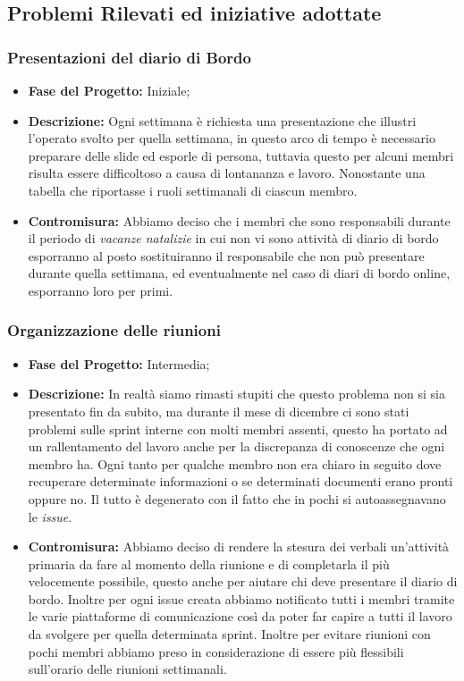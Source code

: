 \documentclass{article}
\begin{document}
\subsection{Problemi Rilevati ed iniziative adottate}
\subsubsection{Presentazioni del diario di Bordo}
\begin{itemize}
    \item \textbf{Fase del Progetto:} Iniziale;
    \item \textbf{Descrizione:} Ogni settimana è richiesta una presentazione che illustri l'operato svolto per quella settimana, in questo arco di tempo è necessario preparare delle slide ed esporle di persona, tuttavia questo per alcuni membri risulta essere difficoltoso a causa di lontananza e lavoro. Nonostante una tabella che riportasse i ruoli settimanali di ciascun membro.
    \item \textbf{Contromisura:} Abbiamo deciso che i membri che sono responsabili durante il periodo di \textit{vacanze natalizie} in cui non vi sono attività di diario di bordo esporranno al posto sostituiranno il responsabile che non può presentare durante quella settimana, ed eventualmente nel caso di diari di bordo online, esporranno loro per primi.
\end{itemize}
\subsubsection{Organizzazione delle riunioni}
\begin{itemize}
    \item \textbf{Fase del Progetto:} Intermedia;
    \item \textbf{Descrizione:} In realtà siamo rimasti stupiti che questo problema non si sia presentato fin da subito, ma durante il mese di dicembre ci sono stati problemi sulle sprint interne con molti membri assenti, questo ha portato ad un rallentamento del lavoro anche per la discrepanza di conoscenze che ogni membro ha. Ogni tanto per qualche membro non era chiaro in seguito dove recuperare determinate informazioni o se determinati documenti erano pronti oppure no. Il tutto è degenerato con il fatto che in pochi si autoassegnavano le \textit{issue}.
    \item \textbf{Contromisura:} Abbiamo deciso di rendere la stesura dei verbali un'attività primaria da fare al momento della riunione e di completarla il più velocemente possibile, questo anche per aiutare chi deve presentare il diario di bordo. Inoltre per ogni issue creata abbiamo notificato tutti i membri tramite le varie piattaforme di comunicazione così da poter far capire a tutti il lavoro da svolgere per quella determinata sprint. Inoltre per evitare riunioni con pochi membri abbiamo preso in considerazione di essere più flessibili sull'orario delle riunioni settimanali.
\end{itemize}
\end{document}

